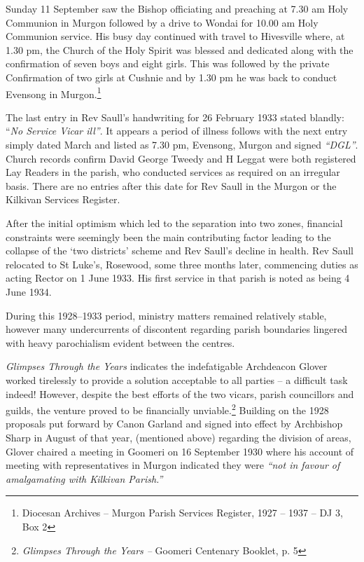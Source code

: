 Sunday 11 September saw the Bishop officiating and preaching at 7.30 am Holy Communion in Murgon followed by a drive to Wondai for 10.00 am Holy Communion service. His busy day continued with travel to Hivesville where, at 1.30 pm, the Church of the Holy Spirit was blessed and dedicated along with the confirmation of seven boys and eight girls. This was followed by the private Confirmation of two girls at Cushnie and by 1.30 pm he was back to conduct Evensong in Murgon.\footnote{Diocesan Archives -- Murgon Parish Services Register, 1927 -- 1937 -- DJ 3, Box 2}


The last entry in Rev Saull's handwriting for 26 February 1933 stated blandly: ``\emph{No Service Vicar ill''}. It appears a period of illness follows with the next entry simply dated March and listed as 7.30 pm, Evensong, Murgon and signed \emph{``DGL''}. Church records confirm David George Tweedy and H Leggat were both registered Lay Readers in the parish, who conducted services as required on an irregular basis. There are no entries after this date for Rev Saull in the Murgon or the Kilkivan Services Register.



After the initial optimism which led to the separation into two zones, financial constraints were seemingly been the main contributing factor leading to the collapse of the `two districts' scheme and Rev Saull's decline in health. Rev Saull relocated to St Luke's, Rosewood, some three months later, commencing duties as acting Rector on 1 June 1933. His first service in that parish is noted as being 4 June 1934.



During this 1928--1933 period, ministry matters remained relatively stable, however many undercurrents of discontent regarding parish boundaries lingered with heavy parochialism evident between the centres.



\emph{Glimpses Through the Years} indicates the indefatigable Archdeacon Glover worked tirelessly to provide a solution acceptable to all parties -- a difficult task indeed! However, despite the best efforts of the two vicars, parish councillors and guilds, the venture proved to be financially unviable.\footnote{\emph{Glimpses Through the Years --} Goomeri Centenary Booklet, p. 5} Building on the 1928 proposals put forward by Canon Garland and signed into effect by Archbishop Sharp in August of that year, (mentioned above) regarding the division of areas, Glover chaired a meeting in Goomeri on 16 September 1930 where his account of meeting with representatives in Murgon indicated they were \emph{``not in favour of amalgamating with Kilkivan Parish.''}








